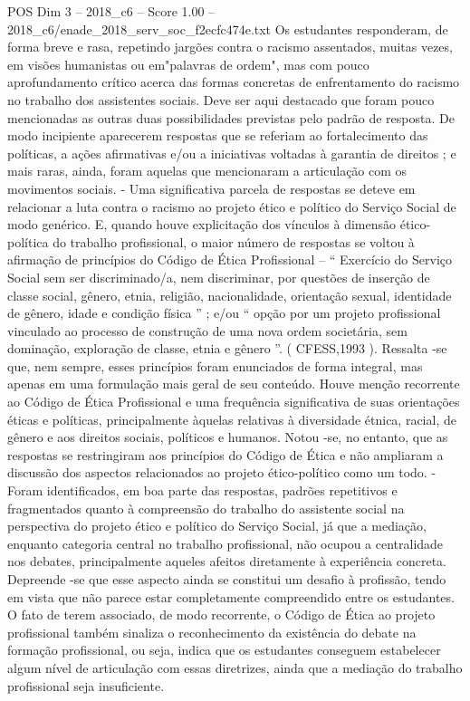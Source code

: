 \begin{textsample}{POS Dim 3 – 2018\_c6 – Score 1.00 – 2018\_c6/enade\_2018\_serv\_soc\_f2ecfc474e.txt}
Os estudantes responderam, de forma breve e rasa, repetindo jargões contra o racismo assentados, muitas vezes, em visões humanistas ou em"palavras de ordem", mas com pouco aprofundamento crítico acerca das formas concretas de enfrentamento do racismo no trabalho dos assistentes sociais.
Deve ser aqui destacado que foram pouco mencionadas as outras duas possibilidades previstas pelo padrão de resposta.
De modo incipiente aparecerem respostas que se referiam ao fortalecimento das políticas, a ações afirmativas e/ou a iniciativas voltadas à garantia de direitos ; e mais raras, ainda, foram aquelas que mencionaram a articulação com os movimentos sociais. - Uma significativa parcela de respostas se deteve em relacionar a luta contra o racismo ao projeto ético e político do Serviço Social de modo genérico.
E, quando houve explicitação dos vínculos à dimensão ético-política do trabalho profissional, o maior número de respostas se voltou à afirmação de princípios do Código de Ética Profissional – “ Exercício do Serviço Social sem ser discriminado/a, nem discriminar, por questões de inserção de classe social, gênero, etnia, religião, nacionalidade, orientação sexual, identidade de gênero, idade e condição física ” ; e/ou “ opção por um projeto profissional vinculado ao processo de construção de uma nova ordem societária, sem dominação, exploração de classe, etnia e gênero ”. ( CFESS,1993 ).
Ressalta -se que, nem sempre, esses princípios foram enunciados de forma integral, mas apenas em uma formulação mais geral de seu conteúdo.
Houve menção recorrente ao Código de Ética Profissional e uma frequência significativa de suas orientações éticas e políticas, principalmente àquelas relativas à diversidade étnica, racial, de gênero e aos direitos sociais, políticos e humanos.
Notou -se, no entanto, que as respostas se restringiram aos princípios do Código de Ética e não ampliaram a discussão dos aspectos relacionados ao projeto ético-político como um todo. - Foram identificados, em boa parte das respostas, padrões repetitivos e fragmentados quanto à compreensão do trabalho do assistente social na perspectiva do projeto ético e político do Serviço Social, já que a mediação, enquanto categoria central no trabalho profissional, não ocupou a centralidade nos debates, principalmente aqueles afeitos diretamente à experiência concreta.
Depreende -se que esse aspecto ainda se constitui um desafio à profissão, tendo em vista que não parece estar completamente compreendido entre os estudantes.
O fato de terem associado, de modo recorrente, o Código de Ética ao projeto profissional também sinaliza o reconhecimento da existência do debate na formação profissional, ou seja, indica que os estudantes conseguem estabelecer algum nível de articulação com essas diretrizes, ainda que a mediação do trabalho profissional seja insuficiente.

\end{textsample}
